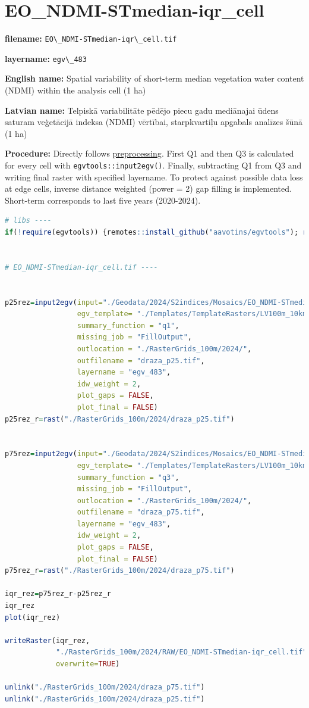 \documentclass[
]{book}
\newcommand{\passthrough}[1]{#1}
\begin{document}
\section{EO\_NDMI-STmedian-iqr\_cell}\label{ch06.483}

\textbf{filename:} \passthrough{\lstinline!EO\_NDMI-STmedian-iqr\_cell.tif!}

\textbf{layername:} \passthrough{\lstinline!egv\_483!}

\textbf{English name:} Spatial variability of short-term median vegetation water content (NDMI) within the analysis cell (1 ha)

\textbf{Latvian name:} Telpiskā variabilitāte pēdējo piecu gadu mediānajai ūdens saturam veģetācijā indeksa (NDMI) vērtībai, starpkvartiļu apgabals analīzes šūnā (1 ha)

\textbf{Procedure:} Directly follows \hyperref[Ch04.13]{preprocessing}. First Q1 and then Q3
is calculated for every cell with \passthrough{\lstinline!egvtools::input2egv()!}. Finally, subtracting
Q1 from Q3 and writing final raster with specified layername. To protect against possible data loss at edge cells,
inverse distance weighted (power = 2) gap filling is implemented. Short-term corresponds
to last five years (2020-2024).

\begin{lstlisting}[language=R]
# libs ----
if(!require(egvtools)) {remotes::install_github("aavotins/egvtools"); require(egvtools)}


# EO_NDMI-STmedian-iqr_cell.tif ----


p25rez=input2egv(input="./Geodata/2024/S2indices/Mosaics/EO_NDMI-STmedian.tif",
                 egv_template= "./Templates/TemplateRasters/LV100m_10km.tif",
                 summary_function = "q1",
                 missing_job = "FillOutput",
                 outlocation = "./RasterGrids_100m/2024/",
                 outfilename = "draza_p25.tif",
                 layername = "egv_483",
                 idw_weight = 2,
                 plot_gaps = FALSE,
                 plot_final = FALSE)
p25rez_r=rast("./RasterGrids_100m/2024/draza_p25.tif")


p75rez=input2egv(input="./Geodata/2024/S2indices/Mosaics/EO_NDMI-STmedian.tif",
                 egv_template= "./Templates/TemplateRasters/LV100m_10km.tif",
                 summary_function = "q3",
                 missing_job = "FillOutput",
                 outlocation = "./RasterGrids_100m/2024/",
                 outfilename = "draza_p75.tif",
                 layername = "egv_483",
                 idw_weight = 2,
                 plot_gaps = FALSE,
                 plot_final = FALSE)
p75rez_r=rast("./RasterGrids_100m/2024/draza_p75.tif")

iqr_rez=p75rez_r-p25rez_r
iqr_rez
plot(iqr_rez)

writeRaster(iqr_rez,
            "./RasterGrids_100m/2024/RAW/EO_NDMI-STmedian-iqr_cell.tif",
            overwrite=TRUE)

unlink("./RasterGrids_100m/2024/draza_p75.tif")
unlink("./RasterGrids_100m/2024/draza_p25.tif")
\end{lstlisting}
\end{document}
